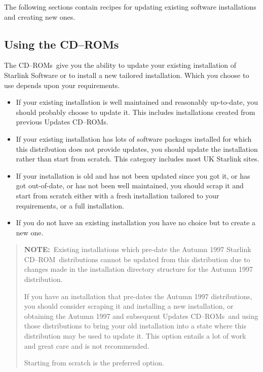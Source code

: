 \documentclass[twoside,11pt]{article}
\newcommand{\xlabel}[1]{}
\renewcommand{\_}{\texttt{\symbol{95}}}
\newcommand{\cdrom}{CD--ROM}
\newcommand{\cdrom}{CD-ROM}
\newcommand{\cdroms}{CD--ROMs}
\newcommand{\cdroms}{CD-ROMs}
\begin{document}
The following sections contain recipes for updating existing software
installations and creating new ones.

\subsection{\xlabel{using_the_cdroms}Using the \cdroms}
\label{using_the_cdroms}

The \cdroms\ give you the ability to update your existing
installation of Starlink Software or to install a new tailored
installation.  Which you choose to use depends upon your requirements.

\begin{itemize}

\item If your existing installation is well maintained and reasonably
up-to-date, you should probably choose to update it.  This includes
installations created from previous Updates \cdroms.

\item If your existing installation has lots of software packages
installed for which this distribution does not provide updates, you
should update the installation rather than start from scratch.
This category includes most UK Starlink sites.

\item If your installation is old and has not been updated since you got
it, or has got out-of-date, or has not been well maintained, you should
scrap it and start from scratch either with a fresh installation tailored
to your requirements, or a full installation.

\item If you do not have an existing installation you have no choice but to
create a new one.

\end{itemize}

\begin{quote}
\textbf{NOTE:}~Existing installations which pre-date the Autumn 1997
Starlink \cdrom\ distributions cannot be updated from this distribution
due to changes made in the installation directory structure for the
Autumn 1997 distribution.

If you have an installation that pre-dates the Autumn 1997
distributions, you should consider scraping it and installing a new
installation, or obtaining the Autumn 1997 and subsequent Updates
\cdroms\ and using those distributions to bring your old installation
into a state where this distribution may be used to update it.  This
option entails a lot of work and great care and is not recommended.

Starting from scratch is the preferred option.
\end{quote}
\end{document}
